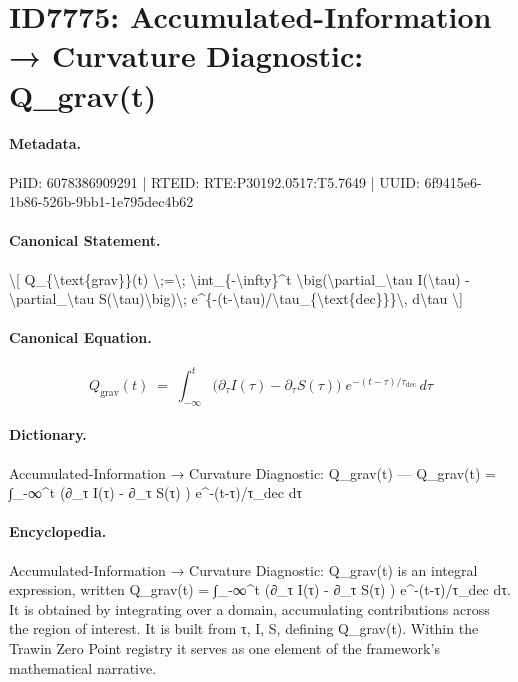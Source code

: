 \section*{ID7775: Accumulated-Information → Curvature Diagnostic: Q\_grav(t)}
\paragraph{Metadata.}
PiID: 6078386909291 | RTEID: RTE:P30192.0517:T5.7649 | UUID: 6f9415e6-1b86-526b-9bb1-1e795dec4b62

\paragraph{Canonical Statement.}
\textbackslash{}[ Q\_\{\textbackslash{}text\{grav\}\}(t) \textbackslash{};=\textbackslash{}; \textbackslash{}int\_\{-\textbackslash{}infty\}\textasciicircum{}t \textbackslash{}big(\textbackslash{}partial\_\textbackslash{}tau I(\textbackslash{}tau) - \textbackslash{}partial\_\textbackslash{}tau S(\textbackslash{}tau)\textbackslash{}big)\textbackslash{}; e\textasciicircum{}\{-(t-\textbackslash{}tau)/\textbackslash{}tau\_\{\textbackslash{}text\{dec\}\}\}\textbackslash{}, d\textbackslash{}tau \textbackslash{}]

\paragraph{Canonical Equation.}
\[
Q_{\text{grav}}(t) \;=\; \int_{-\infty}^t \big(\partial_\tau I(\tau) - \partial_\tau S(\tau)\big)\; e^{-(t-\tau)/\tau_{\text{dec}}}\, d\tau
\]

\paragraph{Dictionary.}
Accumulated-Information → Curvature Diagnostic: Q\_grav(t) — Q\_grav(t) = ∫\_-∞\textasciicircum{}t (∂\_τ I(τ) - ∂\_τ S(τ) ) e\textasciicircum{}-(t-τ)/τ\_dec dτ

\paragraph{Encyclopedia.}
Accumulated-Information → Curvature Diagnostic: Q\_grav(t) is an integral expression, written Q\_grav(t) = ∫\_-∞\textasciicircum{}t (∂\_τ I(τ) - ∂\_τ S(τ) ) e\textasciicircum{}-(t-τ)/τ\_dec dτ. It is obtained by integrating over a domain, accumulating contributions across the region of interest. It is built from τ, I, S, defining Q\_grav(t). Within the Trawin Zero Point registry it serves as one element of the framework's mathematical narrative.
